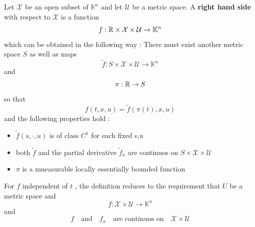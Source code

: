 \begin{definizione}
	Let $\mathcal{X}$ be an open subset of $\mathbb{K}^n$ and let $\mathcal{U}$ be a metric space. A \textbf{right hand side} with respect to $\mathcal{X}$ is a function 
	\[ f : \mathbb{R} \times \mathcal{X} \times \mathcal{U} \rightarrow \mathbb{K}^n\]
	which can be obtained in the following way : There must exist another metric space $S$ as well as maps 
	\[\tilde{f} : S \times \mathcal{X} \times \mathcal{U} \rightarrow \mathbb{K}^n\] and 
	\[ \pi : \mathbb{R} \rightarrow S\]
	so that \[f(t , x , u) = \tilde{f}(\pi(t) , x , u )\] 
	and the following properties hold : 
	\begin{itemize}
		\item $\tilde{f}(s , \cdot , u) $ is of class $C^1$ for each fixed s,u 
		\item both $\tilde{f}$ and the partial derivative $\tilde{f}_x$ are continuos on $S \times \mathcal{X} \times \mathcal{U} $
		\item $\pi$ is a mueasurable locally essentially bounded function
	\end{itemize}
\end{definizione}
For $f$ independent of $t$ , the definition reduces to the requirement that $U$ be a metric space and 
$$f : \mathcal{X} \times \mathcal{U} \rightarrow \mathbb{K}^n$$ 
and \[f \quad \text{and} \quad f_x \quad \text{are continuos on} \quad \mathcal{X} \times \mathcal{U}\]

